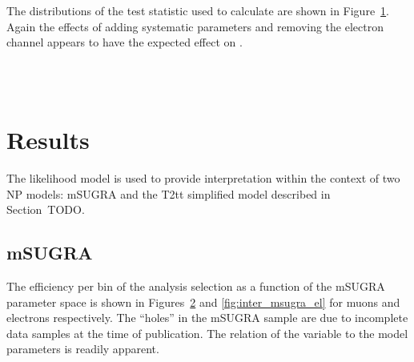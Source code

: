 The distributions of the test statistic used to calculate \CLs are shown in
Figure~\ref{fig:inter_cls}. Again the effects of adding systematic parameters
and removing the electron channel appears to have the expected effect on
\CLs.
\begin{figure}[h!]
\centering
{}\quad
{}\\
\quad
{}\\
\caption[]{}
\label{fig:inter_cls}
\end{figure}

\section{Results}
The likelihood model is used to provide interpretation within the context of two
\ac{NP} models: \ac{mSUGRA} and the \ac{T2tt} simplified model described in
Section~TODO.

\subsection{\ac{mSUGRA}}
The efficiency per \STlep bin of the analysis selection as a function of the
\ac{mSUGRA} parameter space is shown in Figures~\ref{fig:inter_msugra_mu} and
\ref{fig:inter_msugra_el} for muons and electrons respectively. The ``holes'' in
the \ac{mSUGRA} sample are due to incomplete data samples at the time of
publication. The relation of the \STlep variable to the model parameters is
readily apparent.

\begin{figure}[h!]
\centering
{}
\\
\caption[]{}
\label{fig:inter_msugra_mu}
\end{figure}


